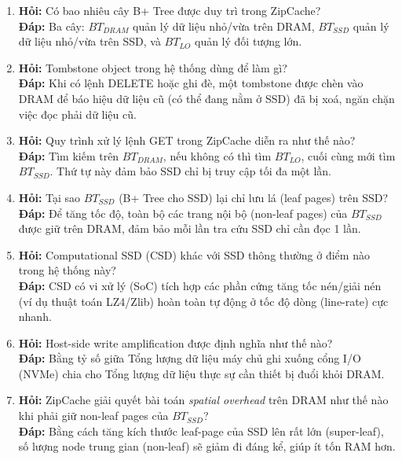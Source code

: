 \documentclass[12pt,a4paper]{article}
\begin{document}
\begin{enumerate}
    \item \textbf{Hỏi:} Có bao nhiêu cây B+ Tree được duy trì trong ZipCache? \\
    \textbf{Đáp:} Ba cây: $BT_{DRAM}$ quản lý dữ liệu nhỏ/vừa trên DRAM, $BT_{SSD}$ quản lý dữ liệu nhỏ/vừa trên SSD, và $BT_{LO}$ quản lý đối tượng lớn.
    
    \item \textbf{Hỏi:} Tombstone object trong hệ thống dùng để làm gì? \\
    \textbf{Đáp:} Khi có lệnh DELETE hoặc ghi đè, một tombstone được chèn vào DRAM để báo hiệu dữ liệu cũ (có thể đang nằm ở SSD) đã bị xoá, ngăn chặn việc đọc phải dữ liệu cũ.
    
    \item \textbf{Hỏi:} Quy trình xử lý lệnh GET trong ZipCache diễn ra như thế nào? \\
    \textbf{Đáp:} Tìm kiếm trên $BT_{DRAM}$, nếu không có thì tìm $BT_{LO}$, cuối cùng mới tìm $BT_{SSD}$. Thứ tự này đảm bảo SSD chỉ bị truy cập tối đa một lần.
    
    \item \textbf{Hỏi:} Tại sao $BT_{SSD}$ (B+ Tree cho SSD) lại chỉ lưu lá (leaf pages) trên SSD? \\
    \textbf{Đáp:} Để tăng tốc độ, toàn bộ các trang nội bộ (non-leaf pages) của $BT_{SSD}$ được giữ trên DRAM, đảm bảo mỗi lần tra cứu SSD chỉ cần đọc 1 lần.
    
    \item \textbf{Hỏi:} Computational SSD (CSD) khác với SSD thông thường ở điểm nào trong hệ thống này? \\
    \textbf{Đáp:} CSD có vi xử lý (SoC) tích hợp các phần cứng tăng tốc nén/giải nén (ví dụ thuật toán LZ4/Zlib) hoàn toàn tự động ở tốc độ dòng (line-rate) cực nhanh.
    
    \item \textbf{Hỏi:} Host-side write amplification được định nghĩa như thế nào? \\
    \textbf{Đáp:} Bằng tỷ số giữa Tổng lượng dữ liệu máy chủ ghi xuống cổng I/O (NVMe) chia cho Tổng lượng dữ liệu thực sự cần thiết bị đuổi khỏi DRAM.
    
    \item \textbf{Hỏi:} ZipCache giải quyết bài toán \textit{spatial overhead} trên DRAM như thế nào khi phải giữ non-leaf pages của $BT_{SSD}$? \\
    \textbf{Đáp:} Bằng cách tăng kích thước leaf-page của SSD lên rất lớn (super-leaf), số lượng node trung gian (non-leaf) sẽ giảm đi đáng kể, giúp ít tốn RAM hơn.
    

\end{enumerate}
\end{document}
